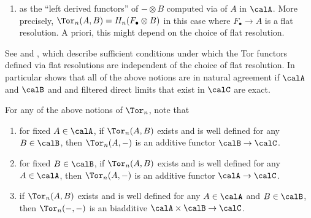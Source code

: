 \begin{definition}
\begin{enumerate}
    \item as the ``left derived functors'' of $- \otimes B$ computed via  of $A$ in $\calA$. More precisely, $\Tor_n(A,B) = H_n(F_\bullet \otimes B)$ in this case where $F_\bullet \to A$ is a flat resolution. A priori, this might depend on the choice of flat resolution.

\end{enumerate}
See  and , which describe sufficient conditions under which the Tor functors defined via flat resolutions are independent of the choice of flat resolution. In particular  shows that all of the above notions are in natural agreement if $\calA$ and $\calB$  and  and filtered direct limits that exist in $\calC$ are exact.

For any of the above notions of $\Tor_n$, note that
\begin{enumerate}
    \item for fixed $A \in \calA$, if $\Tor_n(A,B)$ exists and is well defined for any $B \in \calB$, then $\Tor_n(A,-)$ is an additive functor $\calB \to \calC$. 
    \item for fixed $B \in \calB$, if $\Tor_n(A,B)$ exists and is well defined for any $A \in \calA$, then $\Tor_n(A,-)$ is an additive functor $\calA \to \calC$. 
    \item if $\Tor_n(A,B)$ exists and is well defined for any $A \in \calA$ and $B \in \calB$, then $\Tor_n(-,-)$ is an biadditive $\calA \times \calB \to \calC$. 
\end{enumerate}



\end{definition}
